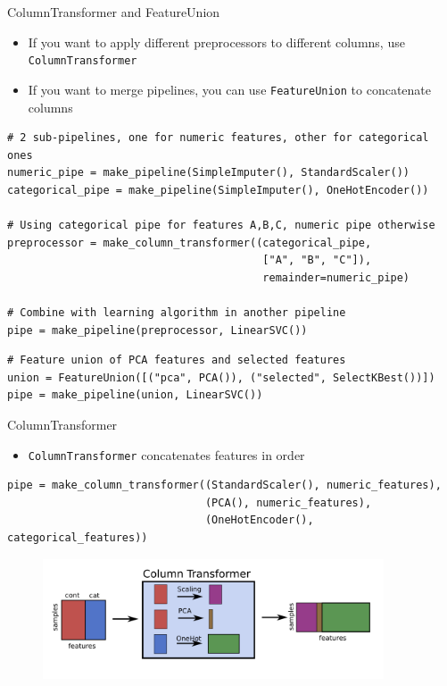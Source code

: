 \begin{frame}[fragile]{ColumnTransformer and FeatureUnion}
\begin{itemize}
    \item If you want to apply different preprocessors to different columns, use \texttt{ColumnTransformer}
    \item If you want to merge pipelines, you can use \texttt{FeatureUnion} to concatenate columns
\end{itemize}

\vspace{1em}
\scriptsize
\begin{verbatim}
# 2 sub-pipelines, one for numeric features, other for categorical ones
numeric_pipe = make_pipeline(SimpleImputer(), StandardScaler())
categorical_pipe = make_pipeline(SimpleImputer(), OneHotEncoder())

# Using categorical pipe for features A,B,C, numeric pipe otherwise
preprocessor = make_column_transformer((categorical_pipe,
                                        ["A", "B", "C"]),
                                        remainder=numeric_pipe)

# Combine with learning algorithm in another pipeline
pipe = make_pipeline(preprocessor, LinearSVC())
\end{verbatim}

\vspace{1em}
\begin{verbatim}
# Feature union of PCA features and selected features
union = FeatureUnion([("pca", PCA()), ("selected", SelectKBest())])
pipe = make_pipeline(union, LinearSVC())
\end{verbatim}
\normalsize
\end{frame}


\begin{frame}[fragile]{ColumnTransformer}
\begin{itemize}
    \item \texttt{ColumnTransformer} concatenates features in order
\end{itemize}

\vspace{1em}
\scriptsize
\begin{verbatim}
pipe = make_column_transformer((StandardScaler(), numeric_features),
                               (PCA(), numeric_features),
                               (OneHotEncoder(), categorical_features))
\end{verbatim}
\normalsize

\begin{figure}
    \centering
    \includegraphics[width=0.9\textwidth,keepaspectratio]{images/pre-processing/columntransformer.png}
\end{figure}
\end{frame}


